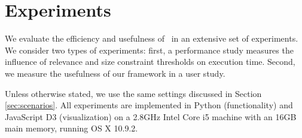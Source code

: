 \section{Experiments}
\label{sec:exp}
We evaluate the efficiency and usefulness of \framework\ in an extensive set of experiments. We consider two types of experiments: first, a performance study measures the influence of relevance and size constraint thresholds on execution time. Second, we measure the usefulness of our framework in a user study.

\vspace{5pt}
 Unless otherwise stated, we use the same settings discussed in Section \ref{sec:scenarios}. All experiments are implemented in Python (functionality) and JavaScript D3 (visualization) on a 2.8GHz Intel Core i5 machine with an 16GB main memory, running OS X 10.9.2.


